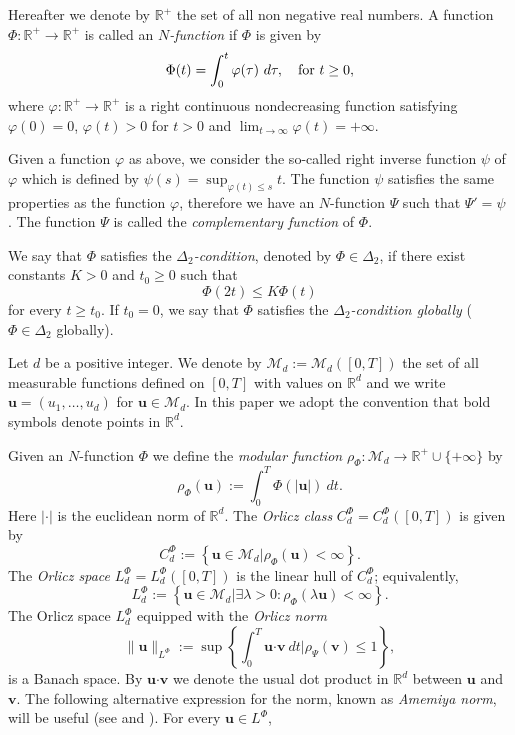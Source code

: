 \documentclass[twoside]{article}
\theoremstyle{remark}
\newcommand{\orlnor}{\|_{L^{\Phi}}}
\newcommand{\lphi}{L^{\Phi}}
\newcommand{\claseor}{C^{\Phi}}
\renewcommand{\b}[1]{\boldsymbol{#1}}
\renewcommand{\leq}{\leqslant}
\begin{document}
Hereafter we denote  by $\mathbb{R}^+$  the set of all non negative real numbers. A function $\Phi:\mathbb{R}^+\to \mathbb{R}^+ $ is called an \emph{$N$-function} if $\Phi$ is given by 
\[
\Phi(t)=\int_{0}^t \varphi(\tau)\ d\tau,\quad\hbox{for } t\geq 0,
\]
where $\varphi:\mathbb{R}^+\rightarrow \mathbb{R}^+$ is a right continuous nondecreasing function  satisfying   $\varphi(0)=0$, $\varphi(t)>0$ for $t>0$ and
$\lim_{t\rightarrow \infty}\varphi(t)=+\infty$.

Given a function $\varphi$ as above, we  consider the so-called right inverse function $\psi$ of $\varphi$ which is 
defined by $\psi(s)=\sup_{\varphi(t)\leq s}t$.
The function $\psi$ satisfies the same properties as the function $\varphi$, therefore we have an $N$-function $\Psi$ such that $\Psi'=\psi$ .
 The function $\Psi$ is called the \emph{complementary function} of $\Phi$.


We say that $\Phi$ satisfies the  \emph{$\Delta_2$-condition}, denoted by $\Phi \in \Delta_2$, 
if there exist  constants $K>0$ and  $t_0\geq 0$ such that 
\begin{equation}\label{delta2defi}\Phi(2t)\leq K\Phi(t)
\end{equation}
for every $t\geq t_0$. 
If $t_0=0$,  we say that $\Phi$ satisfies the \emph{$\Delta_2$-condition globally} ($\Phi \in \Delta_2$ globally).  


Let $d$ be a positive integer. We denote by $\mathcal{M}_d:=\mathcal{M}_d([0,T])$ the set of all measurable functions defined on $[0,T]$ with values on $\mathbb{R}^d$ and  we write $\b{u}=(u_1,\dots,u_d)$ for  $\b{u}\in \mathcal{M}_d$.
In this paper we adopt the convention that bold symbols denote points in $\mathbb{R}^d$.


Given  an $N$-function $\Phi$ we define the \emph{modular function} 
$\rho_{\Phi}:\mathcal{M}_d\to \mathbb{R}^+\cup\{+\infty\}$ by
\[\rho_{\Phi}(\b{u}):= \int_0^T \Phi(|\b{u}|)\ dt.\]
Here $|\cdot|$ is the euclidean norm of $\mathbb{R}^d$.
The \emph{Orlicz class} $C_d^{\Phi}=C_d^{\Phi}([0,T])$  is given  by
\begin{equation}\label{claseOrlicz}
  C^{\Phi}_d:=\left\{\b{u}\in \mathcal{M}_d | \rho_{\Phi}(\b{u})< \infty \right\}.
\end{equation}
The \emph{Orlicz space} $\lphi_d=L^{\Phi}_d([0,T])$ is the linear hull of $\claseor_d$;
equivalently,
\begin{equation}\label{espacioOrlicz}
\lphi_d:=\left\{ \b{u}\in \mathcal{M}_d | \exists \lambda>0: \rho_{\Phi}(\lambda \b{u}) < \infty   \right\}.
\end{equation}
  The Orlicz space $\lphi_d$ equipped with the \emph{Orlicz norm}
\[
\|  \b{u}  \orlnor:=\sup \left\{  \int_0^T \b{u}\b{\cdot} \b{v}\ dt \big| \rho_{\Psi}(\b{v})\leq 1\right\},
\]
is a Banach space. By $\b{u}\b{\cdot} \b{v}$ we denote the usual dot product in $\mathbb{R}^{d}$ between $\b{u}$ and $\b{v}$.  
The following alternative expression for the norm, known as \emph{Amemiya norm},     will  be useful (see \cite[Thm. 10.5]{KR} and \cite{hudzik2000amemiya}). For every $\b{u}\in\lphi$,
\end{document}
